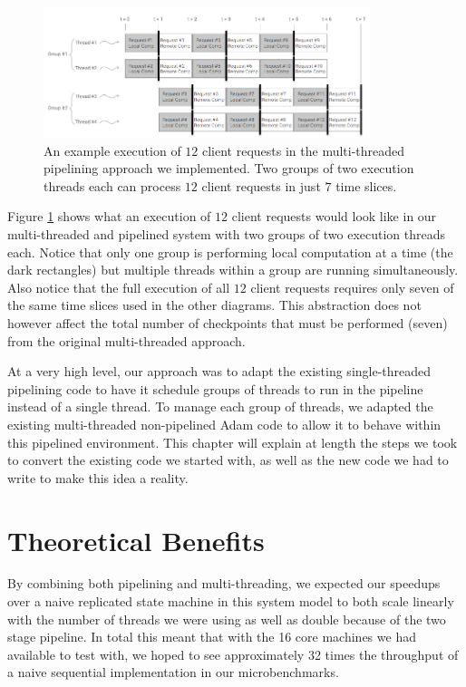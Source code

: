 \documentclass[11pt, oneside]{report}
\begin{document}
\begin{figure}[h]
\centering
\includegraphics[width=0.85\textwidth]{PipelinedParallel.png}
\caption{\label{parpipe}An example execution of $12$ client requests in the multi-threaded pipelining approach we implemented. Two groups of two execution threads each can process $12$ client requests in just $7$ time slices.}
\end{figure}

Figure \ref{parpipe} shows what an execution of $12$ client requests would look like in our multi-threaded and pipelined system with two groups of two execution threads each. 
Notice that only one group is performing local computation at a time (the dark rectangles) but multiple threads within a group are running simultaneously.
Also notice that the full execution of all $12$ client requests requires only seven of the same time slices used in the other diagrams.
This abstraction does not however affect the total number of checkpoints that must be performed (seven) from the original multi-threaded approach.

At a very high level, our approach was to adapt the existing single-threaded pipelining code to have it schedule groups of threads to run in the pipeline instead of a single thread. 
To manage each group of threads, we adapted the existing multi-threaded non-pipelined Adam code to allow it to behave within this pipelined environment. 
This chapter will explain at length the steps we took to convert the existing code we started with, as well as the new code we had to write to make this idea a reality.

\section{Theoretical Benefits}

By combining both pipelining and multi-threading, we expected our speedups over a naive replicated state machine in this system model to both scale linearly with the number of threads we were using as well as double because of the two stage pipeline. 
In total this meant that with the 16 core machines we had available to test with, we hoped to see approximately 32 times the throughput of a naive sequential implementation in our microbenchmarks. 
\end{document}
